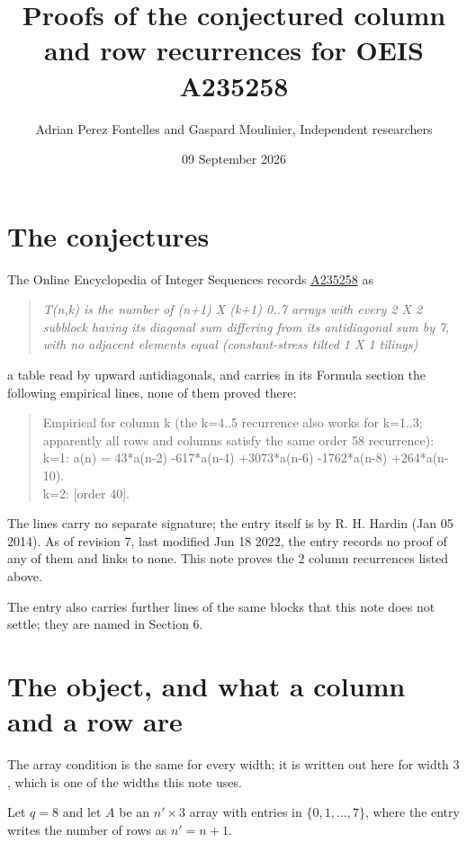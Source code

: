 \documentclass[11pt]{article}
\title{Proofs of the conjectured column and row recurrences for OEIS A235258}
\author{Adrian Perez Fontelles and Gaspard Moulinier, Independent researchers}
\date{09 September 2026}
\theoremstyle{definition}
\begin{document}
\maketitle
\section{The conjectures}

The Online Encyclopedia of Integer Sequences records \href{https://oeis.org/A235258}{A235258} as

\begin{quote}\itshape T(n,k) is the number of (n+1) X (k+1) 0..7 arrays with every 2 X 2 subblock having its diagonal sum differing from its antidiagonal sum by 7, with no adjacent elements equal (constant-stress tilted 1 X 1 tilings)\end{quote}

a table read by upward antidiagonals, and carries in its Formula section the following empirical lines, none of them proved there:

\begin{quote}\ttfamily Empirical for column k (the k=4..5 recurrence also works for k=1..3; apparently all rows and columns satisfy the same order 58 recurrence):\\
k=1: a(n) = 43*a(n-2) -617*a(n-4) +3073*a(n-6) -1762*a(n-8) +264*a(n-10).\\k=2: [order 40].\end{quote}

The lines carry no separate signature; the entry itself is by R. H. Hardin (Jan 05 2014). As of revision 7, last modified Jun 18 2022, the entry records no proof of any of them and links to none. This note proves the 2 column recurrences listed above.

The entry also carries further lines of the same blocks that this note does not settle; they are named in Section 6.

\section{The object, and what a column and a row are}

The array condition is the same for every width; it is written out here for width $3$, which is one of the widths this note uses.

Let $q = 8$ and let $A$ be an $n' \times 3$ array with entries in $\{0,1,\dots,7\}$, where the entry writes the number of rows as $n' = n + 1$.
\end{document}

